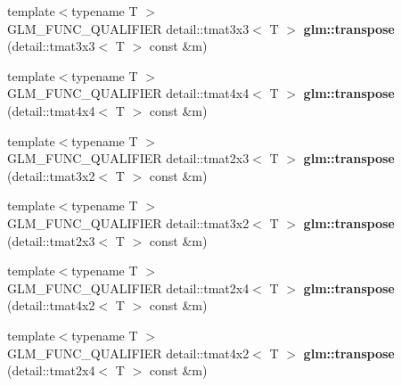 \begin{DoxyCompactItemize}
\item 
\hypertarget{namespaceglm_a98952332d8165d133ab5122f2ffaf428}{}{\footnotesize template$<$typename T $>$ }\\G\+L\+M\+\_\+\+F\+U\+N\+C\+\_\+\+Q\+U\+A\+L\+I\+F\+I\+E\+R detail\+::tmat3x3$<$ T $>$ {\bfseries glm\+::transpose} (detail\+::tmat3x3$<$ T $>$ const \&m)\label{namespaceglm_a98952332d8165d133ab5122f2ffaf428}

\item 
\hypertarget{namespaceglm_ab9ab40d606cce96e1170448437cb6f74}{}{\footnotesize template$<$typename T $>$ }\\G\+L\+M\+\_\+\+F\+U\+N\+C\+\_\+\+Q\+U\+A\+L\+I\+F\+I\+E\+R detail\+::tmat4x4$<$ T $>$ {\bfseries glm\+::transpose} (detail\+::tmat4x4$<$ T $>$ const \&m)\label{namespaceglm_ab9ab40d606cce96e1170448437cb6f74}

\item 
\hypertarget{namespaceglm_a45c436155979bc13e854fb1c2aa7469b}{}{\footnotesize template$<$typename T $>$ }\\G\+L\+M\+\_\+\+F\+U\+N\+C\+\_\+\+Q\+U\+A\+L\+I\+F\+I\+E\+R detail\+::tmat2x3$<$ T $>$ {\bfseries glm\+::transpose} (detail\+::tmat3x2$<$ T $>$ const \&m)\label{namespaceglm_a45c436155979bc13e854fb1c2aa7469b}

\item 
\hypertarget{namespaceglm_a4313124a0d33b556ab63305ca7e0911f}{}{\footnotesize template$<$typename T $>$ }\\G\+L\+M\+\_\+\+F\+U\+N\+C\+\_\+\+Q\+U\+A\+L\+I\+F\+I\+E\+R detail\+::tmat3x2$<$ T $>$ {\bfseries glm\+::transpose} (detail\+::tmat2x3$<$ T $>$ const \&m)\label{namespaceglm_a4313124a0d33b556ab63305ca7e0911f}

\item 
\hypertarget{namespaceglm_aed2ebe1b1aea15e43bad09005b29fb8a}{}{\footnotesize template$<$typename T $>$ }\\G\+L\+M\+\_\+\+F\+U\+N\+C\+\_\+\+Q\+U\+A\+L\+I\+F\+I\+E\+R detail\+::tmat2x4$<$ T $>$ {\bfseries glm\+::transpose} (detail\+::tmat4x2$<$ T $>$ const \&m)\label{namespaceglm_aed2ebe1b1aea15e43bad09005b29fb8a}

\item 
\hypertarget{namespaceglm_a002e61c20163bd62a0af2d18a9a3af7a}{}{\footnotesize template$<$typename T $>$ }\\G\+L\+M\+\_\+\+F\+U\+N\+C\+\_\+\+Q\+U\+A\+L\+I\+F\+I\+E\+R detail\+::tmat4x2$<$ T $>$ {\bfseries glm\+::transpose} (detail\+::tmat2x4$<$ T $>$ const \&m)\label{namespaceglm_a002e61c20163bd62a0af2d18a9a3af7a}


\end{DoxyCompactItemize}
